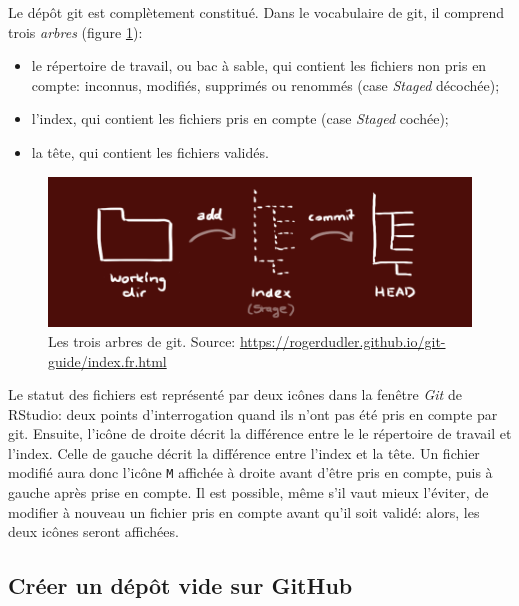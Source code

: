 \documentclass[
  12pt,
  french,
  a4paper,
  extrafontsizes,onecolumn,openright
  ]{memoir}
\providecommand{\tightlist}{%
  \setlength{\itemsep}{0pt}\setlength{\parskip}{0pt}}
\begin{document}
Le dépôt git est complètement constitué.
Dans le vocabulaire de git, il comprend trois \emph{arbres} (figure \ref{fig:git-Trees}):

\begin{itemize}
\tightlist
\item
  le répertoire de travail, ou bac à sable, qui contient les fichiers non pris en compte: inconnus, modifiés, supprimés ou renommés (case \emph{Staged} décochée);
\item
  l'index, qui contient les fichiers pris en compte (case \emph{Staged} cochée);
\item
  la tête, qui contient les fichiers validés.
\end{itemize}



\scriptsize

\begin{figure}

{\centering \includegraphics[width=0.8\linewidth]{images/git-Trees} 

}

\caption{Les trois arbres de git. Source: \url{https://rogerdudler.github.io/git-guide/index.fr.html}}\label{fig:git-Trees}
\end{figure}

\normalsize

Le statut des fichiers est représenté par deux icônes dans la fenêtre \emph{Git} de RStudio: deux points d'interrogation quand ils n'ont pas été pris en compte par git.
Ensuite, l'icône de droite décrit la différence entre le le répertoire de travail et l'index.
Celle de gauche décrit la différence entre l'index et la tête.
Un fichier modifié aura donc l'icône \texttt{M} affichée à droite avant d'être pris en compte, puis à gauche après prise en compte.
Il est possible, même s'il vaut mieux l'éviter, de modifier à nouveau un fichier pris en compte avant qu'il soit validé: alors, les deux icônes seront affichées.

\subsection{Créer un dépôt vide sur GitHub}\label{cruxe9er-un-duxe9puxf4t-vide-sur-github}
\end{document}
